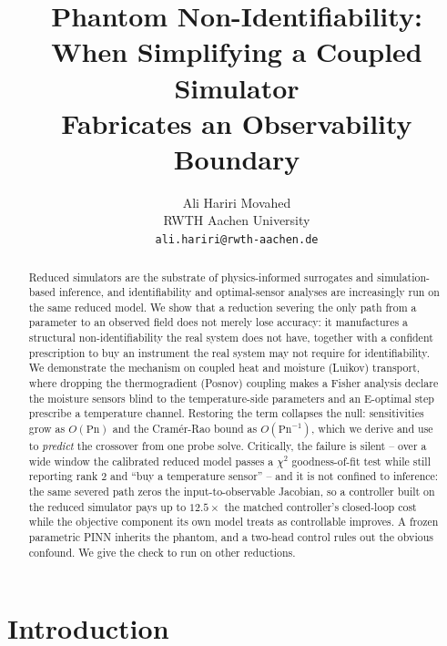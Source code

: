 \documentclass{article}
\title{Phantom Non-Identifiability:\\
When Simplifying a Coupled Simulator\\
Fabricates an Observability Boundary}
\author{%
  Ali Hariri Movahed\\
  RWTH Aachen University\\
  \texttt{ali.hariri@rwth-aachen.de}
}
\begin{document}
\maketitle

\begin{abstract}
Reduced simulators are the substrate of physics-informed surrogates and simulation-based inference,
and identifiability and optimal-sensor analyses are increasingly run on the same reduced model. We
show that a reduction severing the only path from a parameter to an observed field does not merely
lose accuracy: it manufactures a structural non-identifiability the real system does not have,
together with a confident prescription to buy an instrument the real system may not require for
identifiability. We demonstrate the mechanism on coupled heat and moisture (Luikov) transport, where
dropping the thermogradient (Posnov) coupling makes a Fisher analysis declare the moisture sensors
blind to the temperature-side parameters and an E-optimal step prescribe a temperature channel.
Restoring the term collapses the null: sensitivities grow as $O(\mathrm{Pn})$ and the Cram\'er-Rao
bound as $O(\mathrm{Pn}^{-1})$, which we derive and use to \emph{predict} the crossover from one probe
solve. Critically, the failure is silent -- over a wide window the calibrated reduced model passes a
$\chi^2$ goodness-of-fit test while still reporting rank $2$ and ``buy a temperature sensor'' -- and it
is not confined to inference: the same severed path zeros the input-to-observable Jacobian, so a
controller built on the reduced simulator pays up to $12.5\times$ the matched controller's closed-loop
cost while the objective component its own model treats as controllable improves. A frozen parametric
PINN inherits the phantom, and a two-head control rules out the obvious confound. We give the check
to run on other reductions.
\end{abstract}

\section{Introduction}
\end{document}
